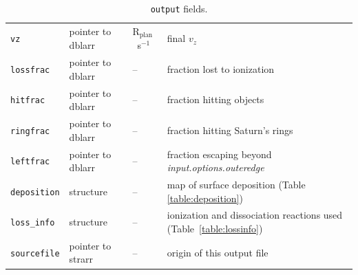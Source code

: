 \documentclass[11pt]{article}
\newcommand\Rplan{R$_{\mathrm{plan}}$}
\begin{document}
\begin{table}
\begin{tabular}{llll}
\texttt{vz} & pointer to dblarr & \Rplan\ s$^{-1}$ & final $v_z$ \\
\texttt{lossfrac} & pointer to dblarr & -- & fraction lost to ionization \\
\texttt{hitfrac} & pointer to dblarr & -- & fraction hitting objects \\
\texttt{ringfrac} & pointer to dblarr & -- & fraction hitting Saturn's rings \\
\texttt{leftfrac} & pointer to dblarr & -- & fraction escaping beyond 
  \textit{input.options.outeredge} \\
\texttt{deposition} & structure & -- & map of surface deposition (Table
\ref{table:deposition}) \\
\texttt{loss\_info} & structure & -- & ionization and dissociation reactions
used (Table~\ref{table:lossinfo}) \\
\texttt{sourcefile} & pointer to strarr & -- & origin of this output file
\end{tabular}
\caption[\texttt{output} fields]{\texttt{output} fields.}
\label{table:outputstructure}
\end{table}
\clearpage

\end{document}
